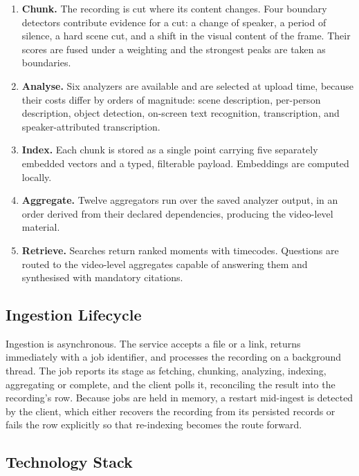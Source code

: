 \documentclass[11pt,a4paper]{article}
\begin{document}
\begin{enumerate}[leftmargin=1.6em]
  \item \textbf{Chunk.} The recording is cut where its content changes. Four
        boundary detectors contribute evidence for a cut: a change of speaker, a
        period of silence, a hard scene cut, and a shift in the visual content of
        the frame. Their scores are fused under a weighting and the strongest
        peaks are taken as boundaries.
  \item \textbf{Analyse.} Six analyzers are available and are selected at upload
        time, because their costs differ by orders of magnitude: scene
        description, per-person description, object detection, on-screen text
        recognition, transcription, and speaker-attributed transcription.
  \item \textbf{Index.} Each chunk is stored as a single point carrying five
        separately embedded vectors and a typed, filterable payload. Embeddings
        are computed locally.
  \item \textbf{Aggregate.} Twelve aggregators run over the saved analyzer
        output, in an order derived from their declared dependencies, producing
        the video-level material.
  \item \textbf{Retrieve.} Searches return ranked moments with timecodes.
        Questions are routed to the video-level aggregates capable of answering
        them and synthesised with mandatory citations.
\end{enumerate}

\subsection{Ingestion Lifecycle}

Ingestion is asynchronous. The service accepts a file or a link, returns
immediately with a job identifier, and processes the recording on a background
thread. The job reports its stage as fetching, chunking, analyzing, indexing,
aggregating or complete, and the client polls it, reconciling the result into
the recording's row. Because jobs are held in memory, a restart mid-ingest is
detected by the client, which either recovers the recording from its persisted
records or fails the row explicitly so that re-indexing becomes the route
forward.

\subsection{Technology Stack}
\end{document}
